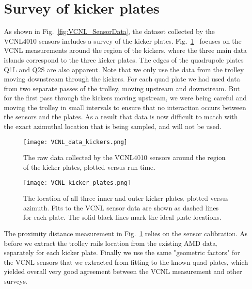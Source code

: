 \section{\label{sec:kicker_survey} Survey of kicker plates}
\medskip


As shown in Fig.~\ref{fig:VCNL_SensorData}, the dataset collected by the VCNL4010 sensors includes a survey of the kicker plates. 
Fig.~\ref{fig:VCNL_data_kickers}~\cite{Kargiantoulakis:doc16976} focuses on the VCNL measurements around the region of the kickers, where the three main data islands correspond to the three kicker plates. The edges of the quadrupole plates Q1L and Q2S are also apparent.
Note that we only use the data from the trolley moving downstream through the kickers. For each quad plate we had used data from two separate passes of the trolley, moving upstream and downstream. 
But for the first pass through the kickers moving upstream, we were being careful and moving the trolley in small intervals to ensure that no interaction occurs between the sensors and the plates. As a result that data is now difficult to match with the exact azimuthal location that is being sampled, and will not be used.

\begin{figure}[h!]
	\centering
	\texttt{[image: VCNL\_data\_kickers.png]}
	\caption{The raw data collected by the VCNL4010 sensors around the region of the kicker plates, plotted versus run time. 
	}\label{fig:VCNL_data_kickers}
\end{figure}



\begin{figure}[h!]
	\centering
	\texttt{[image: VCNL\_kicker\_plates.png]}
	\caption{The location of all three inner and outer kicker plates, plotted versus azimuth. Fits to the VCNL sensor data are shown as dashed lines for each plate. The solid black lines mark the ideal plate locations.
	}\label{fig:VCNL_kicker_plates}
\end{figure}



The proximity distance measurement in Fig.~\ref{fig:VCNL_data_kickers} relies on the sensor calibration.
As before we extract the trolley rails location from the existing AMD data, separately for each kicker plate.
Finally we use the same "geometric factors" for the VCNL sensors that we extracted from fitting to the known quad plates, which yielded overall very good agreement between the VCNL measurement and other surveys.


